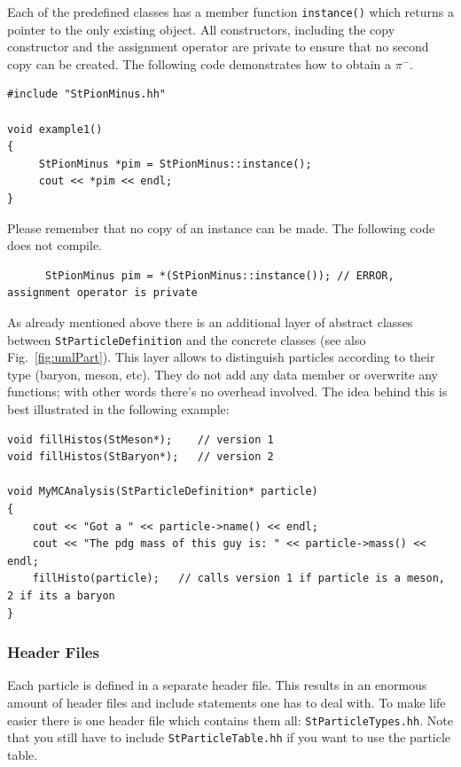 \documentclass[twoside]{article}
\newcommand{\comp}[1]{\texttt{#1}}%
\begin{document}
\begin{description}
Each of the predefined classes has a member function \comp{instance()} which returns
a pointer to the only existing object. All constructors, including the copy constructor
and the assignment operator are private to ensure that no second copy can be created.
The following code demonstrates how to obtain a $\pi^-$.

{\footnotesize
\begin{verbatim}
#include "StPionMinus.hh"

void example1()
{
     StPionMinus *pim = StPionMinus::instance();
     cout << *pim << endl; 
}
\end{verbatim}
}

Please remember that no copy of an instance can be made. The following code
does not compile.

{\footnotesize
\begin{verbatim}
      StPionMinus pim = *(StPionMinus::instance()); // ERROR, assignment operator is private 
\end{verbatim}
}

As already mentioned above there is an additional layer of abstract classes
between \comp{StParticleDefinition} and the concrete classes (see also Fig.~\ref{fig:umlPart}).
This layer allows to distinguish particles according to their type (baryon, meson, etc).
They do not add any data member or overwrite any functions; with other words there's no overhead involved.
The idea behind this is best illustrated in the following example: 

{\footnotesize
\begin{verbatim}
void fillHistos(StMeson*);    // version 1 
void fillHistos(StBaryon*);   // version 2 

void MyMCAnalysis(StParticleDefinition* particle) 
{ 
    cout << "Got a " << particle->name() << endl; 
    cout << "The pdg mass of this guy is: " << particle->mass() << endl; 
    fillHisto(particle);   // calls version 1 if particle is a meson, 2 if its a baryon 
} 
\end{verbatim}
}

\subsubsection{Header Files}

Each particle is defined in a separate header file.
This results in an enormous amount of header files and include statements
one has to deal with. To make life easier there is one header file which contains
them all: \comp{StParticleTypes.hh}. Note that you still have to include
\comp{StParticleTable.hh} if you want to use the particle table.



\end{description}
\end{document}
